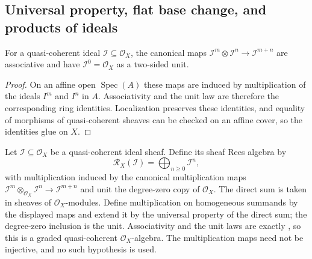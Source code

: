 \subsection{Universal property, flat base change, and products of ideals}

\begin{lemma}
  \label{lemma:nagata-sheaf-ideal-powers-assoc}

  For a quasi-coherent ideal $\mathcal I\subseteq\mathcal O_X$, the canonical
  maps $\mathcal I^m\otimes\mathcal I^n\to\mathcal I^{m+n}$ are associative
  and have $\mathcal I^0=\mathcal O_X$ as a two-sided unit.
\end{lemma}

\begin{proof}
  On an affine open $\operatorname{Spec}(A)$ these maps are induced by
  multiplication of the ideals $I^m$ and $I^n$ in $A$.  Associativity and the
  unit law are therefore the corresponding ring identities.  Localization
  preserves these identities, and equality of morphisms of quasi-coherent
  sheaves can be checked on an affine cover, so the identities glue on $X$.
\end{proof}

\begin{definition}
  \label{def:nagata-sheaf-rees-algebra}

  Let $\mathcal I\subseteq\mathcal O_X$ be a quasi-coherent ideal sheaf.  Define
  its sheaf Rees algebra by
  \[
    \mathcal R_X(\mathcal I)=\bigoplus_{n\geq0}\mathcal I^n,
  \]
  with multiplication induced by the canonical multiplication maps
  $\mathcal I^m\otimes_{\mathcal O_X}\mathcal I^n\to
  \mathcal I^{m+n}$ and unit the degree-zero copy of $\mathcal O_X$.
  The direct sum is taken in sheaves of $\mathcal O_X$-modules.  Define
  multiplication on homogeneous summands by the displayed maps and extend it
  by the universal property of the direct sum; the degree-zero inclusion is
  the unit.  Associativity and the unit laws are exactly
  , so this is a graded
  quasi-coherent $\mathcal O_X$-algebra.  The multiplication maps need not be
  injective, and no such hypothesis is used.
\end{definition}

